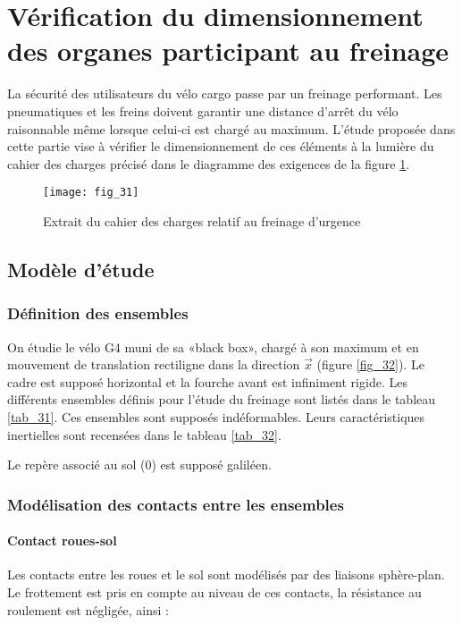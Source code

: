 \section{Vérification du dimensionnement des organes participant au freinage \label{ATS_2024_sec3}}
\ifprof
\else
La sécurité des utilisateurs du vélo cargo passe par un freinage performant. Les pneumatiques et les freins doivent garantir une distance d'arrêt du vélo raisonnable même lorsque celui-ci est chargé au maximum. L'étude proposée dans cette partie vise à vérifier le dimensionnement de ces éléments à la lumière du cahier des charges précisé dans le diagramme des exigences de la figure \ref{fig_3_cargo}.

\begin{figure}[!h]
\centering
\texttt{[image: fig\_31]}
\caption{\label{fig_3_cargo}Extrait du cahier des charges relatif au freinage d'urgence}
\end{figure}

\fi

\subsection{Modèle d'étude}
\ifprof
\else
\subsubsection{Définition des ensembles}
On étudie le vélo G4 muni de sa «black box», chargé à son maximum et en mouvement de translation rectiligne dans la direction \(\vec{x}\) (figure \ref{fig_32}). Le cadre est supposé horizontal et la fourche avant est infiniment rigide. Les différents ensembles définis pour l'étude du freinage sont listés dans le tableau \ref{tab_31}. Ces ensembles sont supposés indéformables. Leurs caractéristiques inertielles sont recensées dans le tableau \ref{tab_32}.

Le repère associé au sol (0) est supposé galiléen.

\subsubsection{Modélisation des contacts entre les ensembles}
\paragraph*{Contact roues-sol} 
Les contacts entre les roues et le sol sont modélisés par des liaisons sphère-plan. Le frottement est pris en compte au niveau de ces contacts, la résistance au roulement est négligée, ainsi :

